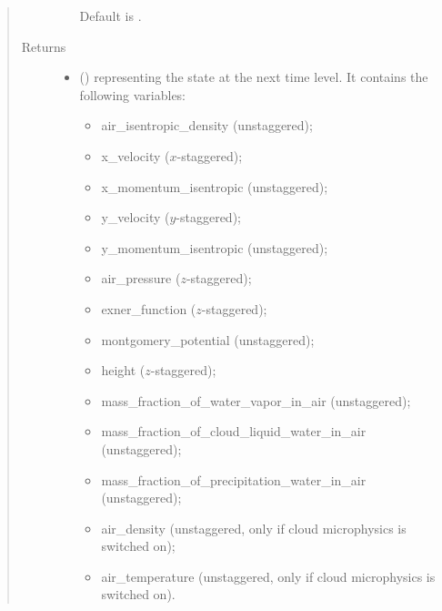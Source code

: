 \documentclass[letterpaper,10pt,english]{sphinxmanual}
\begin{document}
\begin{fulllineitems}
\begin{fulllineitems}
\begin{quote}
\begin{description}
\begin{itemize}
\begin{itemize}
\end{itemize}

Default is .


\end{itemize}

\item[{Returns}] \leavevmode
\begin{itemize}
\item {} 
 () \textendash{} {\hyperref[\detokenize{api:storages.state_isentropic.StateIsentropic}]{}} representing the state at the next time level.
It contains the following variables:
\begin{itemize}
\item {} 
air\_isentropic\_density (unstaggered);

\item {} 
x\_velocity (\(x\)-staggered);

\item {} 
x\_momentum\_isentropic (unstaggered);

\item {} 
y\_velocity (\(y\)-staggered);

\item {} 
y\_momentum\_isentropic (unstaggered);

\item {} 
air\_pressure (\(z\)-staggered);

\item {} 
exner\_function (\(z\)-staggered);

\item {} 
montgomery\_potential (unstaggered);

\item {} 
height (\(z\)-staggered);

\item {} 
mass\_fraction\_of\_water\_vapor\_in\_air (unstaggered);

\item {} 
mass\_fraction\_of\_cloud\_liquid\_water\_in\_air (unstaggered);

\item {} 
mass\_fraction\_of\_precipitation\_water\_in\_air (unstaggered);

\item {} 
air\_density (unstaggered, only if cloud microphysics is switched on);

\item {} 
air\_temperature (unstaggered, only if cloud microphysics is switched on).


\end{itemize}
\end{itemize}
\end{description}
\end{quote}
\end{fulllineitems}
\end{fulllineitems}
\end{document}
